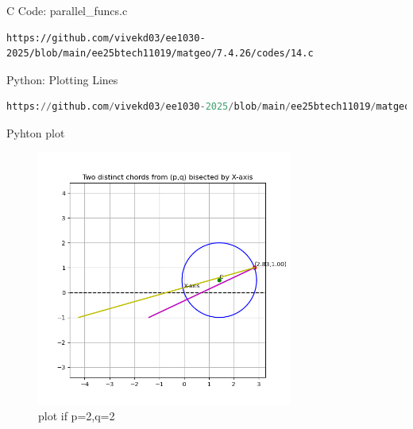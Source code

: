 \documentclass{beamer}
\begin{document}
\begin{frame}[fragile]{C Code: parallel\_funcs.c}
\begin{lstlisting}
https://github.com/vivekd03/ee1030-2025/blob/main/ee25btech11019/matgeo/7.4.26/codes/14.c
\end{lstlisting}
\end{frame}

\begin{frame}[fragile]{Python: Plotting Lines}
\begin{lstlisting}[language=Python, basicstyle=\ttfamily\scriptsize, keywordstyle=\color{blue}]
https://github.com/vivekd03/ee1030-2025/blob/main/ee25btech11019/matgeo/7.4.26/codes/14.py
\end{lstlisting}
\end{frame}

\begin{frame}{Pyhton plot}
\begin{figure}[h!]
    \centering
    \includegraphics[width=0.75\textwidth]{figs/14.png}
    \caption{plot if p=2,q=2}
    \label{fig:example_image}
\end{figure}
\end{frame}
\end{document}
